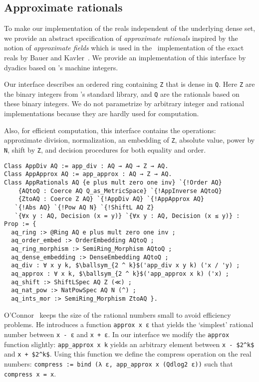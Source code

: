 \documentclass[a4paper,10pt,runningheads]{llncs}
\begin{document}
\subsection{Approximate rationals}\label{section:approx_rationals}
To make our implementation of the reals independent of the underlying dense set, we provide an abstract specification of \emph{approximate rationals} inspired by the notion of \emph{approximate fields} which is used in the \Haskell\ implementation of the exact reals by Bauer and Kavler~\cite{BauerKavkler}. We provide an implementation of this interface by dyadics based on \Coq's machine integers.

Our interface describes an ordered ring containing \lstinline|Z| that is dense in \lstinline|Q|. Here \lstinline|Z| are the binary integers from \Coq's standard library, and \lstinline|Q| are the rationals based on these binary integers. We do not parametrize by arbitrary integer and rational implementations because they are hardly used for computation.

Also, for efficient computation, this interface contains the operations: approximate division, normalization, an embedding of \lstinline|Z|, absolute value, power by \lstinline|N|, shift by \lstinline|Z|, and decision procedures for both equality and order.
\begin{lstlisting}
Class AppDiv AQ := app_div : AQ → AQ → Z → AQ.
Class AppApprox AQ := app_approx : AQ → Z → AQ.
Class AppRationals AQ {e plus mult zero one inv} `{!Order AQ} 
	{AQtoQ : Coerce AQ Q_as_MetricSpace} `{!AppInverse AQtoQ} 
	{ZtoAQ : Coerce Z AQ} `{!AppDiv AQ} `{!AppApprox AQ} 
   `{!Abs AQ} `{!Pow AQ N} `{!ShiftL AQ Z} 
   `{∀x y : AQ, Decision (x = y)} `{∀x y : AQ, Decision (x ≤ y)} : Prop := {
  aq_ring :> @Ring AQ e plus mult zero one inv ;
  aq_order_embed :> OrderEmbedding AQtoQ ;
  aq_ring_morphism :> SemiRing_Morphism AQtoQ ;
  aq_dense_embedding :> DenseEmbedding AQtoQ ;
  aq_div : ∀ x y k, $\ballsym_{2 ^ k}$('app_div x y k) ('x / 'y) ;
  aq_approx : ∀ x k, $\ballsym_{2 ^ k}$('app_approx x k) ('x) ;
  aq_shift :> ShiftLSpec AQ Z (≪) ;
  aq_nat_pow :> NatPowSpec AQ N (^) ;
  aq_ints_mor :> SemiRing_Morphism ZtoAQ }.
\end{lstlisting}
O'Connor~\cite{OConnor:mscs} keeps the size of the rational numbers small to avoid efficiency problems. He introduces a function \mbox{\lstinline|approx x ε|} that yields the `simplest' rational number between \lstinline|x - ε| and \lstinline|x + ε|. In our interface we modify the \lstinline|approx| function slightly: \lstinline|app_approx x k| yields an arbitrary element between \lstinline|x - $2^k$| and \mbox{\lstinline|x + $2^k$|.}
Using this function we define the compress operation on the real numbers: \mbox{\lstinline|compress := bind (λ ε, app_approx x (Qdlog2 ε))|} such that \lstinline|compress x = x|.
\end{document}
